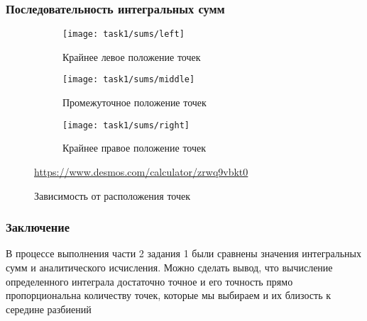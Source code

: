 \subsubsection*{Последовательность интегральных сумм}
\begin{figure}[H]
	\centering
	\begin{subfigure}{0.3\textwidth}
		\centering
		\texttt{[image: task1/sums/left]}\quad
		\caption*{Крайнее левое положение точек}
	\end{subfigure}
	\begin{subfigure}{0.3\textwidth}
		\centering
		\texttt{[image: task1/sums/middle]}\quad
		\caption*{Промежуточное положение точек}
	\end{subfigure}
	\begin{subfigure}{0.3\textwidth}
		\centering
		\texttt{[image: task1/sums/right]}\quad
		\caption*{Крайнее правое положение точек}
	\end{subfigure}
	\caption{Зависимость от расположения точек}
	\url{https://www.desmos.com/calculator/zrwq9vbkt0}
\end{figure}
\subsubsection*{Заключение}
В процессе выполнения части 2 задания 1 были сравнены значения интегральных сумм и аналитического исчисления. Можно сделать вывод, что вычисление определенного интеграла достаточно точное и его точность прямо пропорциональна количеству точек, которые мы выбираем и их близость к середине разбиений



